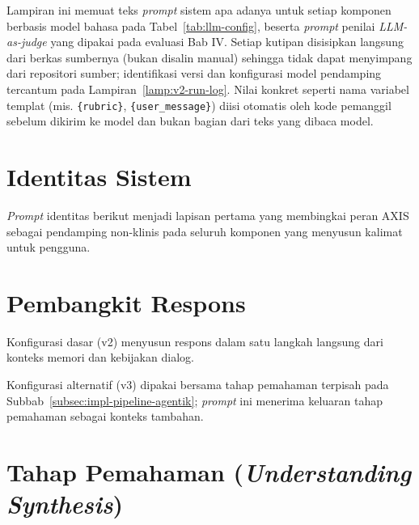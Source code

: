 Lampiran ini memuat teks \textit{prompt} sistem apa adanya untuk setiap komponen berbasis model bahasa pada Tabel~\ref{tab:llm-config}, beserta \textit{prompt} penilai \textit{LLM-as-judge} yang dipakai pada evaluasi Bab IV. Setiap kutipan disisipkan langsung dari berkas sumbernya (bukan disalin manual) sehingga tidak dapat menyimpang dari repositori sumber; identifikasi versi dan konfigurasi model pendamping tercantum pada Lampiran~\ref{lamp:v2-run-log}. Nilai konkret seperti nama variabel templat (mis. \texttt{\{rubric\}}, \texttt{\{user\_message\}}) diisi otomatis oleh kode pemanggil sebelum dikirim ke model dan bukan bagian dari teks yang dibaca model.

\section{Identitas Sistem}
\label{lamp:prompt-identity}

\textit{Prompt} identitas berikut menjadi lapisan pertama yang membingkai peran AXIS sebagai pendamping non-klinis pada seluruh komponen yang menyusun kalimat untuk pengguna.


\section{Pembangkit Respons}
\label{lamp:prompt-response-generator}

Konfigurasi dasar (v2) menyusun respons dalam satu langkah langsung dari konteks memori dan kebijakan dialog.


Konfigurasi alternatif (v3) dipakai bersama tahap pemahaman terpisah pada Subbab~\ref{subsec:impl-pipeline-agentik}; \textit{prompt} ini menerima keluaran tahap pemahaman sebagai konteks tambahan.


\section{Tahap Pemahaman (\textit{Understanding Synthesis})}
\label{lamp:prompt-understanding-synthesis}


